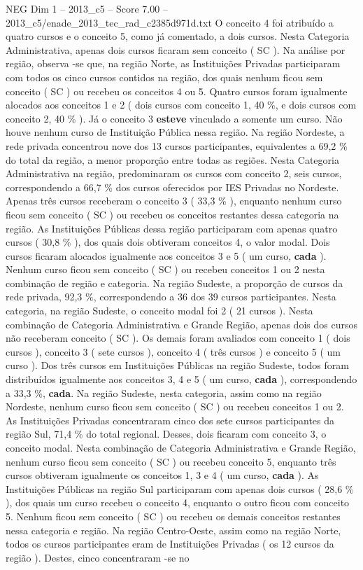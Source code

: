 \begin{textsample}{NEG Dim 1 – 2013\_c5 – Score 7.00 – 2013\_c5/enade\_2013\_tec\_rad\_c2385d971d.txt}
O conceito 4 foi atribuído a quatro cursos e o conceito 5, como já comentado, a dois cursos.
Nesta Categoria Administrativa, apenas dois cursos ficaram sem conceito ( SC ).
Na análise por região, observa -se que, na região Norte, as Instituições Privadas participaram com todos os cinco cursos contidos na região, dos quais nenhum ficou sem conceito ( SC ) ou recebeu os conceitos 4 ou 5.
Quatro cursos foram igualmente alocados aos conceitos 1 e 2 ( dois cursos com conceito 1, 40 \%, e dois cursos com conceito 2, 40 \% ).
Já o conceito 3 \textbf{esteve} vinculado a somente um curso.
Não houve nenhum curso de Instituição Pública nessa região.
Na região Nordeste, a rede privada concentrou nove dos 13 cursos participantes, equivalentes a 69,2 \% do total da região, a menor proporção entre todas as regiões.
Nesta Categoria Administrativa na região, predominaram os cursos com conceito 2, seis cursos, correspondendo a 66,7 \% dos cursos oferecidos por IES Privadas no Nordeste.
Apenas três cursos receberam o conceito 3 ( 33,3 \% ), enquanto nenhum curso ficou sem conceito ( SC ) ou recebeu os conceitos restantes dessa categoria na região.
As Instituições Públicas dessa região participaram com apenas quatro cursos ( 30,8 \% ), dos quais dois obtiveram conceitos 4, o valor modal.
Dois cursos ficaram alocados igualmente aos conceitos 3 e 5 ( um curso, \textbf{cada} ).
Nenhum curso ficou sem conceito ( SC ) ou recebeu conceitos 1 ou 2 nesta combinação de região e categoria.
Na região Sudeste, a proporção de cursos da rede privada, 92,3 \%, correspondendo a 36 dos 39 cursos participantes.
Nesta categoria, na região Sudeste, o conceito modal foi 2 ( 21 cursos ).
Nesta combinação de Categoria Administrativa e Grande Região, apenas dois dos cursos não receberam conceito ( SC ).
Os demais foram avaliados com conceito 1 ( dois cursos ), conceito 3 ( sete cursos ), conceito 4 ( três cursos ) e conceito 5 ( um curso ).
Dos três cursos em Instituições Públicas na região Sudeste, todos foram distribuídos igualmente aos conceitos 3, 4 e 5 ( um curso, \textbf{cada} ), correspondendo a 33,3 \%, \textbf{cada}.
Na região Sudeste, nesta categoria, assim como na região Nordeste, nenhum curso ficou sem conceito ( SC ) ou recebeu conceitos 1 ou 2.
As Instituições Privadas concentraram cinco dos sete cursos participantes da região Sul, 71,4 \% do total regional.
Desses, dois ficaram com conceito 3, o conceito modal.
Nesta combinação de Categoria Administrativa e Grande Região, nenhum curso ficou sem conceito ( SC ) ou recebeu conceito 5, enquanto três cursos obtiveram igualmente os conceitos 1, 3 e 4 ( um curso, \textbf{cada} ).
As Instituições Públicas na região Sul participaram com apenas dois cursos ( 28,6 \% ), dos quais um curso recebeu o conceito 4, enquanto o outro ficou com conceito 5.
Nenhum ficou sem conceito ( SC ) ou recebeu os demais conceitos restantes nessa categoria e região.
Na região Centro-Oeste, assim como na região Norte, todos os cursos participantes eram de Instituições Privadas ( os 12 cursos da região ).
Destes, cinco concentraram -se no

\end{textsample}
